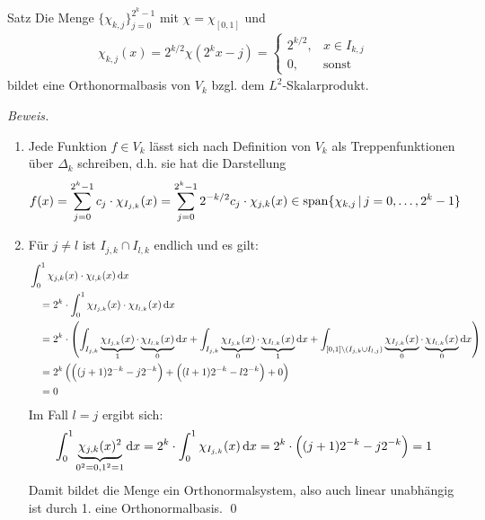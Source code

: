 \begin{colbox}{Satz}\label{satz:chiOrthonorm}
  Die Menge $\{\chi_{k,j}\}_{j=0}^{2^k-1}$ mit $\chi = \chi_{[0,1]}$ und
  \begin{align*}
    \chi_{k,j}(x) = 2^{k/2}\chi(2^kx-j) = \begin{cases}
      2^{k/2}, &x\in I_{k,j}\\
      0, &\text{sonst}
    \end{cases} 
  \end{align*}
  bildet eine Orthonormalbasis von $V_k$ bzgl. dem $L^2$-Skalarprodukt.
\end{colbox}
\textit{Beweis.}
\begin{enumerate}
  \item Jede Funktion $f\in V_k$ lässt sich nach Definition von $V_k$ als Treppenfunktionen über $\Delta_k$ schreiben, 
  d.h. sie hat die Darstellung 
  \begin{align*}
    f(x) 
    = \sum_{j=0}^{2^k-1} c_j\cdot \chi_{I_{j,k}}(x)
    = \sum_{j=0}^{2^k-1} 2^{-k/2}c_j\cdot \chi_{j,k}(x) \in 
    \operatorname*{span}\{\chi_{k,j} \,|\, j=0,\dots,2^k-1\}
  \end{align*}
  \item Für $j\neq l$ ist $I_{j,k}\cap I_{l,k}$ endlich und es gilt:
  \begin{align*}
    &\int_{0}^{1} \chi_{j,k}(x) \cdot \chi_{l,k}(x) \mathop{}\!\mathrm{d} x \\
    &\quad = 2^{k}\cdot \int_{0}^{1} \chi_{I_{j,k}}(x) \cdot \chi_{I_{l,k}}(x) \mathop{}\!\mathrm{d} x \\
    &\quad = 2^{k}\cdot\left(
      \int_{I_{j,k}} \underbrace{\chi_{I_{j,k}}(x)}_{1} \cdot \underbrace{\chi_{I_{l,k}}(x)}_{0} \mathop{}\!\mathrm{d} x
      + \int_{I_{j,k}} \underbrace{\chi_{I_{j,k}}(x)}_{0} \cdot \underbrace{\chi_{I_{l,k}}(x)}_{1} \mathop{}\!\mathrm{d} x
      + \int_{[0,1]\backslash(I_{j,k}\cup I_{l,j})} 
      \underbrace{\chi_{I_{j,k}}(x)}_{0} \cdot \underbrace{\chi_{I_{l,k}}(x)}_{0}  \mathop{}\!\mathrm{d} x
    \right) \\
    &\quad = 2^{k} \left(\Big((j+1)2^{-k} - j2^{-k}\Big) + \Big((l+1)2^{-k} - l2^{-k}\Big) + 0\right) \\
    &\quad = 0
  \end{align*}
  Im Fall $l=j$ ergibt sich:
  \begin{align*}
    \int_{0}^{1} \underbrace{\chi_{j,k}(x)^2}_{0^2=0, 1^2=1} \mathop{}\!\mathrm{d} x 
    = 2^k \cdot \int_{0}^{1} \chi_{I_{j,k}}(x) \mathop{}\!\mathrm{d} x 
    = 2^k \cdot \Big((j+1)2^{-k} - j2^{-k}\Big) 
    = 1
  \end{align*}
  Damit bildet die Menge ein Orthonormalsystem, also auch linear unabhängig ist durch 1. eine Orthonormalbasis.
  \qed
\end{enumerate}

